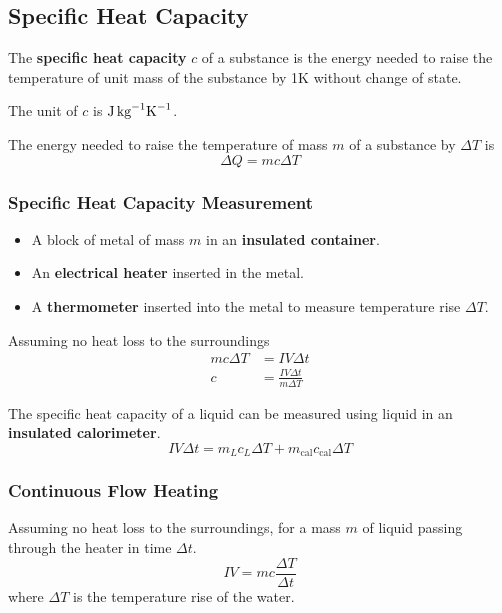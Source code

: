 \subsection{Specific Heat Capacity}

The \textbf{specific heat capacity} $c$ of a substance is the energy needed to raise the temperature of unit mass of the substance by 1K without change of state.

The unit of $c$ is $\text{J\,kg}^{-1}\text{K}^{-1}$.

The energy needed to raise the temperature of mass $m$ of a substance by $\Delta T$ is
$$\Delta Q=mc\Delta T$$

\subsubsection*{Specific Heat Capacity Measurement}
\begin{itemize}
    \item A block of metal of mass $m$ in an \textbf{insulated container}.
    \item An \textbf{electrical heater} inserted in the metal.
    \item A \textbf{thermometer} inserted into the metal to measure temperature rise $\Delta T$.
\end{itemize}

Assuming no heat loss to the surroundings
\begin{align*}
    mc\Delta T&=IV\Delta t\\
    c&=\frac{IV\Delta t}{m\Delta T}
\end{align*}

The specific heat capacity of a liquid can be measured using liquid in an \textbf{insulated calorimeter}.
$$IV\Delta t=m_Lc_L\Delta T+m_\text{cal}c_\text{cal}\Delta T$$

\subsubsection*{Continuous Flow Heating}

Assuming no heat loss to the surroundings, for a mass $m$ of liquid passing through the heater in time $\Delta t$.
$$IV=mc\frac{\Delta T}{\Delta t}$$
where $\Delta T$ is the temperature rise of the water.
